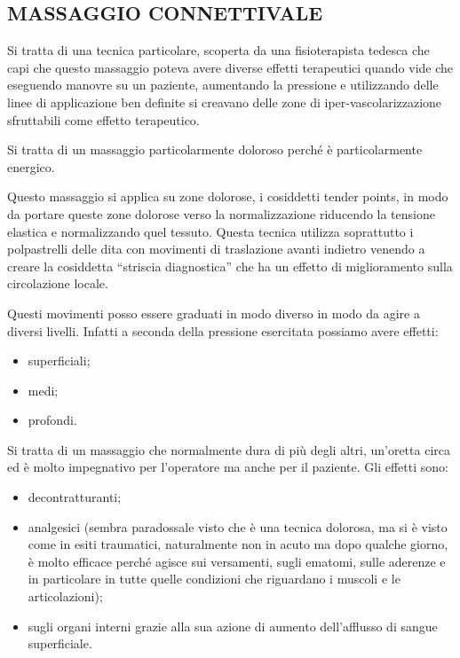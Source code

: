 \subsection{MASSAGGIO CONNETTIVALE}


Si tratta di una tecnica particolare, scoperta da una fisioterapista
tedesca che capi che questo massaggio poteva avere diverse effetti
terapeutici quando vide che eseguendo manovre su un paziente, aumentando
la pressione e utilizzando delle linee di applicazione ben definite si
creavano delle zone di iper-vascolarizzazione sfruttabili come effetto
terapeutico.

Si tratta di un massaggio particolarmente doloroso perché è
particolarmente energico.

Questo massaggio si applica su zone dolorose, i cosiddetti tender
points, in modo da portare queste zone dolorose verso la normalizzazione
riducendo la tensione elastica e normalizzando quel tessuto. Questa
tecnica utilizza soprattutto i polpastrelli delle dita con movimenti di
traslazione avanti indietro venendo a creare la cosiddetta ``striscia
diagnostica'' che ha un effetto di miglioramento sulla circolazione
locale.

Questi movimenti posso essere graduati in modo diverso in modo da agire
a diversi livelli. Infatti a seconda della pressione esercitata possiamo
avere effetti:

\begin{itemize}
\item
  superficiali;
\item
  medi;
\item
  profondi.
\end{itemize}

Si tratta di un massaggio che normalmente dura di più degli altri,
un'oretta circa ed è molto impegnativo per l'operatore ma anche per il
paziente. Gli effetti sono:

\begin{itemize}
\item
  decontratturanti;
\item
  analgesici (sembra paradossale visto che è una tecnica dolorosa, ma si
  è visto come in esiti traumatici, naturalmente non in acuto ma dopo
  qualche giorno, è molto efficace perché agisce sui versamenti, sugli
  ematomi, sulle aderenze e in particolare in tutte quelle condizioni
  che riguardano i muscoli e le articolazioni);
\item
  sugli organi interni grazie alla sua azione di aumento dell'afflusso
  di sangue superficiale.
\end{itemize}

